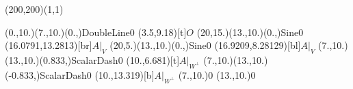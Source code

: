 \unitlength=1bp%

\begin{feynartspicture}(200,200)(1,1)

\FADiagram{}
\FAProp(0.,10.)(7.,10.)(0.,){DoubleLine}{0}
\FALabel(3.5,9.18)[t]{$O$}
\FAProp(20,15.)(13.,10.)(0.,){Sine}{0}
\FALabel(16.0791,13.2813)[br]{$A|_V$}
\FAProp(20,5.)(13.,10.)(0.,){Sine}{0}
\FALabel(16.9209,8.28129)[bl]{$A|_V$}
\FAProp(7.,10.)(13.,10.)(0.833,){ScalarDash}{0}
\FALabel(10.,6.681)[t]{$A|_{W^\perp}$}
\FAProp(7.,10.)(13.,10.)(-0.833,){ScalarDash}{0}
\FALabel(10.,13.319)[b]{$A|_{W^\perp}$}
\FAVert(7.,10.){0}
\FAVert(13.,10.){0}
\end{feynartspicture}

